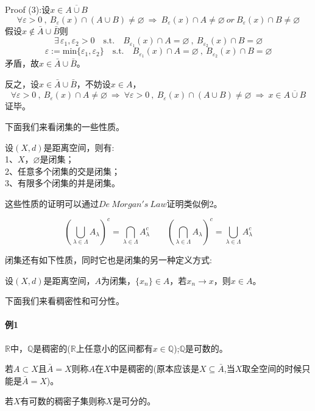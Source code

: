 Proof (3):设$x \in \overline{A \cup B}$
\[\forall \varepsilon>0 \ , \ B_{\varepsilon}(x) \cap (A \cup B) \neq \varnothing \ \Rightarrow \ B_{\varepsilon}(x) \cap A \neq \varnothing \ or \ B_{\varepsilon}(x) \cap B \neq \varnothing\]
假设$x \notin \bar{A} \cup \bar{B}$则
\[\exists \, \varepsilon_1,\varepsilon_2>0 \quad \text{s.t.} \quad B_{\varepsilon_1}(x) \cap A=\varnothing \ , \ B_{\varepsilon_2}(x) \cap B=\varnothing\]
\[\varepsilon:=\text{min}\{\varepsilon_1,\varepsilon_2\} \quad \text{s.t.} \quad B_{\varepsilon_1}(x) \cap A=\varnothing \ , \ B_{\varepsilon_2}(x) \cap B=\varnothing\]
矛盾，故$x \in \bar{A} \cup \bar{B}$。

反之，设$x \in \bar{A} \cup \bar{B}$，不妨设$x \in A$，
\[\forall \varepsilon>0 \ , \ B_{\varepsilon}(x) \cap A \neq \varnothing \ \Rightarrow \ \forall \varepsilon>0 \ , \ B_{\varepsilon}(x) \cap (A \cup B) \neq \varnothing \ \Rightarrow  \ x \in \overline{A \cup B}\]
证毕。

下面我们来看闭集的一些性质。
\begin{theorem}
    设$(X,d)$是距离空间，则有:\\
    1、$X$，$\varnothing$是闭集；\\
    2、任意多个闭集的交是闭集；\\
    3、有限多个闭集的并是闭集。
\end{theorem}

这些性质的证明可以通过$De \ Morgan's \ Law$证明类似例2。
\begin{theorem}
\[\left(\bigcup\limits_{\lambda \in \Lambda}A_{\lambda}\right)^c=\bigcap\limits_{\lambda \in \Lambda}A_{\lambda}^c \qquad \left(\bigcap\limits_{\lambda \in \Lambda}A_{\lambda}\right)^c=\bigcup\limits_{\lambda \in \Lambda}A_{\lambda}^c\]
\end{theorem}

闭集还有如下性质，同时它也是闭集的另一种定义方式:
\begin{theorem}
    设$(X,d)$是距离空间，$A$为闭集，$\{x_n\} \in A$，若$x_n \rightarrow x$，则$x \in A$。
\end{theorem}

下面我们来看稠密性和可分性。

\paragraph*{例1} \quad $\mathbb{R}$中，$\mathbb{Q}$是稠密的($\mathbb{R}$上任意小的区间都有$x \in \mathbb{Q}$);$\mathbb{Q}$是可数的。
\begin{definition}[稠密性]
    若$A \subset X$且$\bar{A}=X$则称$A$在$X$中是稠密的(原本应该是$X \subseteq \bar{A}$,当$X$取全空间的时候只能是$\bar{A}=X$)。
\end{definition}
\begin{definition}[可分性]
    若$X$有可数的稠密子集则称$X$是可分的。
\end{definition}

